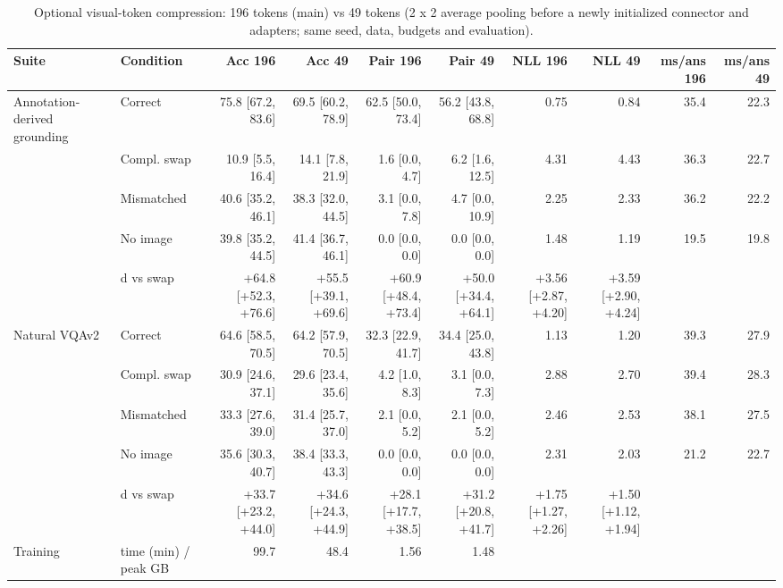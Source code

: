\begin{table}[t]
\centering
\small
\caption{Optional visual-token compression: 196 tokens (main) vs 49 tokens (2 x 2 average pooling before a newly initialized connector and adapters; same seed, data, budgets and evaluation).}
\label{tab:t2_t10_compression}
\begin{tabular}{llrrrrrrrr}
\toprule
Suite & Condition & Acc 196 & Acc 49 & Pair 196 & Pair 49 & NLL 196 & NLL 49 & ms/ans 196 & ms/ans 49 \\
\midrule
Annotation-derived grounding & Correct & 75.8 [67.2, 83.6] & 69.5 [60.2, 78.9] & 62.5 [50.0, 73.4] & 56.2 [43.8, 68.8] & 0.75 & 0.84 & 35.4 & 22.3 \\
 & Compl. swap & 10.9 [5.5, 16.4] & 14.1 [7.8, 21.9] & 1.6 [0.0, 4.7] & 6.2 [1.6, 12.5] & 4.31 & 4.43 & 36.3 & 22.7 \\
 & Mismatched & 40.6 [35.2, 46.1] & 38.3 [32.0, 44.5] & 3.1 [0.0, 7.8] & 4.7 [0.0, 10.9] & 2.25 & 2.33 & 36.2 & 22.2 \\
 & No image & 39.8 [35.2, 44.5] & 41.4 [36.7, 46.1] & 0.0 [0.0, 0.0] & 0.0 [0.0, 0.0] & 1.48 & 1.19 & 19.5 & 19.8 \\
 & d vs swap & +64.8 [+52.3, +76.6] & +55.5 [+39.1, +69.6] & +60.9 [+48.4, +73.4] & +50.0 [+34.4, +64.1] & +3.56 [+2.87, +4.20] & +3.59 [+2.90, +4.24] &  &  \\
Natural VQAv2 & Correct & 64.6 [58.5, 70.5] & 64.2 [57.9, 70.5] & 32.3 [22.9, 41.7] & 34.4 [25.0, 43.8] & 1.13 & 1.20 & 39.3 & 27.9 \\
 & Compl. swap & 30.9 [24.6, 37.1] & 29.6 [23.4, 35.6] & 4.2 [1.0, 8.3] & 3.1 [0.0, 7.3] & 2.88 & 2.70 & 39.4 & 28.3 \\
 & Mismatched & 33.3 [27.6, 39.0] & 31.4 [25.7, 37.0] & 2.1 [0.0, 5.2] & 2.1 [0.0, 5.2] & 2.46 & 2.53 & 38.1 & 27.5 \\
 & No image & 35.6 [30.3, 40.7] & 38.4 [33.3, 43.3] & 0.0 [0.0, 0.0] & 0.0 [0.0, 0.0] & 2.31 & 2.03 & 21.2 & 22.7 \\
 & d vs swap & +33.7 [+23.2, +44.0] & +34.6 [+24.3, +44.9] & +28.1 [+17.7, +38.5] & +31.2 [+20.8, +41.7] & +1.75 [+1.27, +2.26] & +1.50 [+1.12, +1.94] &  &  \\
Training & time (min) / peak GB & 99.7 & 48.4 & 1.56 & 1.48 &  &  &  &  \\
\bottomrule
\end{tabular}
\end{table}
